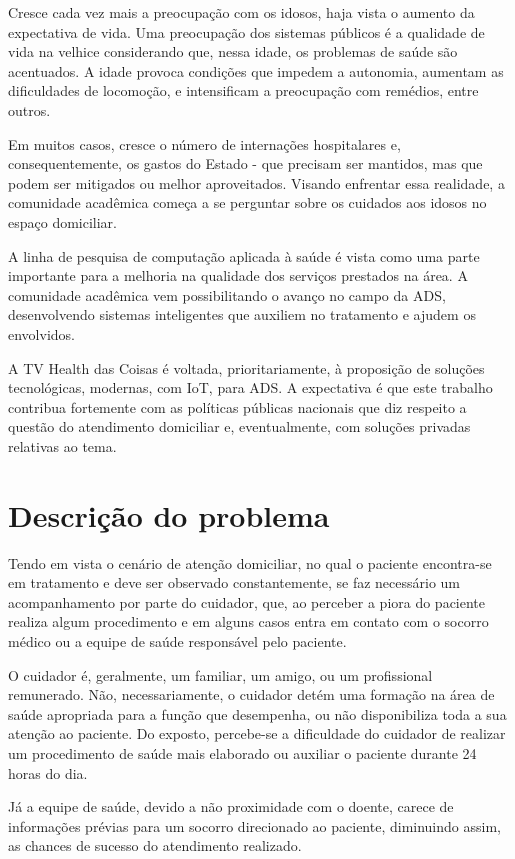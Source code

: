 Cresce cada vez mais a preocupação com os idosos, haja vista o aumento da
expectativa de vida. Uma preocupação dos sistemas públicos é a qualidade de
vida na velhice considerando que, nessa idade, os problemas de saúde são
acentuados. A idade provoca condições que impedem a autonomia, aumentam as
dificuldades de locomoção, e intensificam a preocupação com remédios, entre
outros.

Em muitos casos, cresce o número de internações hospitalares e,
consequentemente, os gastos do Estado - que precisam ser mantidos, mas que
podem ser mitigados ou melhor aproveitados.  Visando enfrentar essa realidade,
a comunidade acadêmica começa a se perguntar sobre os cuidados aos idosos no
espaço domiciliar.

A linha de pesquisa de computação aplicada à saúde é vista como uma parte
importante para a melhoria na qualidade dos serviços prestados na área. A
comunidade acadêmica vem possibilitando o avanço no campo da ADS, desenvolvendo
sistemas inteligentes que auxiliem no tratamento e ajudem os envolvidos.

A TV Health das Coisas é voltada, prioritariamente, à proposição de soluções
tecnológicas, modernas, com IoT, para ADS. A expectativa é que este trabalho
contribua fortemente com as políticas públicas nacionais que diz respeito a
questão do atendimento domiciliar e, eventualmente, com soluções privadas
relativas ao tema.

\section{Descrição do problema}\label{sec:descricao-problema}

Tendo em vista o cenário de atenção domiciliar, no qual o paciente
encontra-se em tratamento e deve ser observado constantemente, 
se faz necessário um acompanhamento por parte do cuidador, que, ao perceber 
a piora do paciente realiza algum procedimento e em alguns casos entra 
em contato com o socorro médico ou a equipe de saúde responsável pelo paciente.

O cuidador é, geralmente, um familiar, um amigo, ou um profissional remunerado.
Não, necessariamente, o cuidador detém uma formação na área de saúde apropriada
para a função que desempenha, ou não disponibiliza toda a sua atenção ao
paciente. Do exposto, percebe-se a dificuldade do cuidador de realizar um
procedimento de saúde mais elaborado ou auxiliar o paciente durante 24 horas do
dia.

Já a equipe de saúde, devido a não proximidade com o doente, carece de informações
prévias para um socorro direcionado ao paciente, diminuindo assim, as chances de
sucesso do atendimento realizado.

